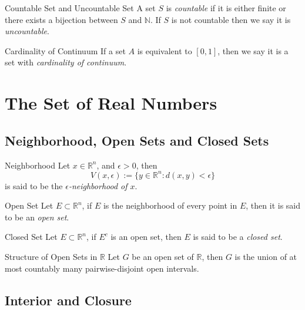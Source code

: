 \begin{definition}{Countable Set and Uncountable Set}{}
  A set $S$ is \emph{countable} if it is either finite or there
  exists a bijection between $S$ and $\mathbb{N}$.
  If $S$ is not countable then we say it is \emph{uncountable}.
\end{definition}

\begin{definition}{Cardinality of Continuum}{}
  If a set $A$ is equivalent to $[0, 1]$,
  then we say it is a set with \emph{cardinality of continuum}.
\end{definition}

\section{The Set of Real Numbers}

\subsection{Neighborhood, Open Sets and Closed Sets}

\begin{definition}{Neighborhood}{}
  Let $x \in \mathbb{R}^n$, and $\epsilon > 0$, then 
  \begin{equation}
    V(x, \epsilon) := \{y \in \mathbb{R}^n: d(x,y) < \epsilon\}
  \end{equation}
  is said to be the \emph{$\epsilon$-neighborhood of $x$}.
\end{definition}

\begin{definition}{Open Set}{}
  Let $E \subset \mathbb{R}^n$, if $E$ is the neighborhood of every point in
  $E$,
  then it is said to be an \emph{open set}.
\end{definition}

\begin{definition}{Closed Set}{}
  Let $E \subset \mathbb{R}^n$, if $E^c$ is an open set,
  then $E$ is said to be a \emph{closed set}.
\end{definition}

\begin{theorem}{Structure of Open Sets in $\mathbb{R}$}{}
  Let $G$ be an open set of $\mathbb{R}$,
  then $G$ is the union of at most countably many pairwise-disjoint open intervals.
\end{theorem}

\subsection{Interior and Closure}

